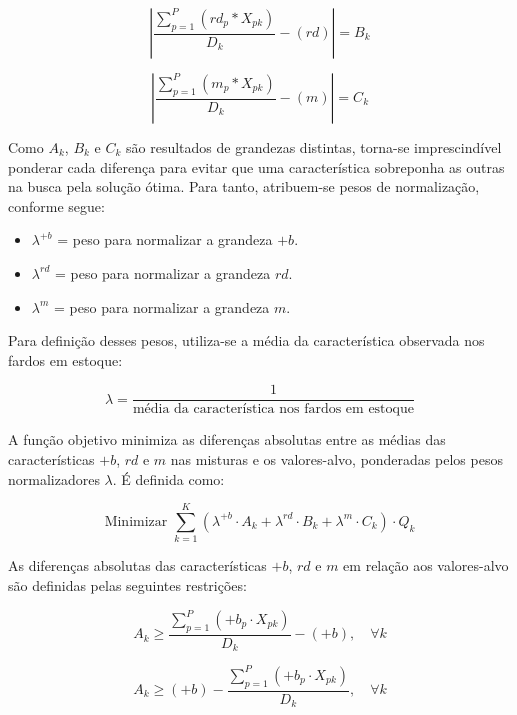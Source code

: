 \documentclass[
    12pt,                %
    openright,           %
    oneside,             %
    a4paper,             %
    english,             %
    spanish,             %
    brazil               %
]{ufscar}
\begin{document}
\begin{equation}
\left| \frac{\sum_{p=1}^{P} (rd_p * X_{pk})}{D_k} - (rd) \right| = B_k 
\end{equation}

\begin{equation}
\left| \frac{\sum_{p=1}^{P} (m_p * X_{pk})}{D_k} - (m) \right| = C_k 
\end{equation}

Como $A_k$, $B_k$ e $C_k$ são resultados de grandezas distintas, torna-se imprescindível ponderar cada diferença para evitar que uma característica sobreponha as outras na busca pela solução ótima. Para tanto, atribuem-se pesos de normalização, conforme segue:

\begin{itemize}
    \item $\lambda^{+b}$ = peso para normalizar a grandeza $+b$.
    \item $\lambda^{rd}$ = peso para normalizar a grandeza $rd$.
    \item $\lambda^{m}$ = peso para normalizar a grandeza $m$.
\end{itemize}

Para definição desses pesos, utiliza-se a média da característica observada nos fardos em estoque:

\begin{equation}
\lambda = \frac{1}{\text{média da característica nos fardos em estoque}} 
\end{equation}

A função objetivo minimiza as diferenças absolutas entre as médias das características $+b$, $rd$ e $m$ nas misturas e os valores-alvo, ponderadas pelos pesos normalizadores $\lambda$. É definida como:

\begin{equation}
\text{Minimizar } \sum_{k=1}^{K} \left( \lambda^{+b} \cdot A_k + \lambda^{rd} \cdot B_k + \lambda^{m} \cdot C_k \right) \cdot Q_k
\end{equation}


As diferenças absolutas das características $+b$, $rd$ e $m$ em relação aos valores-alvo são definidas pelas seguintes restrições:

\begin{equation}
A_k \geq \frac{\sum_{p=1}^{P} (+b_p \cdot X_{pk})}{D_k} - (+b), \quad \forall k
\end{equation}

\begin{equation}
A_k \geq (+b) - \frac{\sum_{p=1}^{P} (+b_p \cdot X_{pk})}{D_k}, \quad \forall k
\end{equation}
\end{document}
